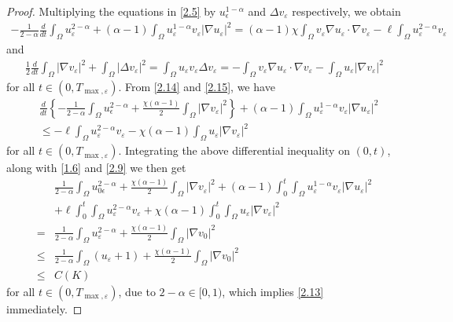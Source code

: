 \documentclass[12pt]{article}
\theoremstyle{plain}
\theoremstyle{definition}
\numberwithin{equation}{section}
\begin{document}
\begin{proof}
Multiplying the equations in \eqref{2.5} by $u_{\epsilon}^{1-\alpha}$ and $\Delta v_{\varepsilon }$ respectively, we obtain
\begin{align}\label{2.14}
    -\frac{1}{2-\alpha}\frac{d}{dt}\int_{\Omega}u_{\varepsilon}^{2-\alpha}+(\alpha-1)\int_{\Omega}
    u_{\varepsilon}^{1-\alpha}v_{\varepsilon}|\nabla  u_{\varepsilon }|^2=(\alpha-1)\chi\int_{\Omega} v_{\varepsilon}\nabla
    u_{\varepsilon}\cdot \nabla v_{\varepsilon}-\ell\int_{\Omega} u_{\varepsilon}^{2-\alpha}v_{\varepsilon}
\end{align}
and
\begin{align}\label{2.15}
    \frac{1}{2}\frac{d}{dt}\int_{\Omega}|\nabla v_{\varepsilon}|^2+\int_{\Omega}|\Delta
    v_{\varepsilon}|^2=\int_{\Omega}u_{\varepsilon}v_{\varepsilon}\Delta v_{\varepsilon}=-\int_{\Omega} v_{\varepsilon}\nabla
    u_{\varepsilon}\cdot \nabla v_{\varepsilon}-\int_{\Omega}u_{\varepsilon}|\nabla v_{\varepsilon}|^2
\end{align}
for all $t \in(0, T_{\max, \varepsilon})$. From \eqref{2.14} and \eqref{2.15}, we have
\begin{align*}
&\frac{d}{dt}\left\{-\frac{1}{2-\alpha}\int_{\Omega} u_{\epsilon}^{2-\alpha}+
  \frac{\chi(\alpha-1)}{2} \int_{\Omega} |\nabla v_{\varepsilon }|^2\right\}+(\alpha-1)\int_{\Omega}
    u_{\varepsilon}^{1-\alpha}v_{\varepsilon}|\nabla  u_{\varepsilon }|^2\\
&\leq -\ell\int_{\Omega} u_{\varepsilon}^{2-\alpha}v_{\varepsilon}-\chi(\alpha-1)\int_{\Omega}u_{\varepsilon}|\nabla v_{\varepsilon}|^2
\end{align*}
for all $t \in(0, T_{\max, \varepsilon})$. Integrating the above differential inequality on $(0,t)$, along with \eqref{1.6} and \eqref{2.9} we then get
\begin{align*}
& \frac{1}{2-\alpha}\int_{\Omega} u_{0\epsilon}^{2-\alpha}+
  \frac{\chi(\alpha-1)}{2} \int_{\Omega} |\nabla v_{\varepsilon }|^2
   +(\alpha-1)\int_0^{t}\int_{\Omega}
    u_{\varepsilon}^{1-\alpha}v_{\varepsilon}|\nabla  u_{\varepsilon }|^2\nonumber\\
    &+\ell\int_0^{t}\int_{\Omega} u_{\varepsilon}^{2-\alpha}v_{\varepsilon}+\chi(\alpha-1)\int_0^{t}\int_{\Omega}u_{\varepsilon}|\nabla
   v_{\varepsilon}|^2\nonumber \\
   = &\frac{1}{2-\alpha}\int_{\Omega} u_{\varepsilon}^{2-\alpha}+
  \frac{\chi(\alpha-1)}{2} \int_{\Omega} |\nabla v_{0 }|^2\nonumber\\
   \leq &\frac{1}{2-\alpha}\int_{\Omega}\left(u_{\varepsilon}+1\right)+
  \frac{\chi(\alpha-1)}{2} \int_{\Omega} |\nabla v_{0 }|^2\nonumber\\
   \leq &C(K)
\end{align*}
for all $t \in(0, T_{\max, \varepsilon})$, due to $2-\alpha\in [0,1)$, which implies \eqref{2.13} immediately.
\end{proof}
\end{document}

